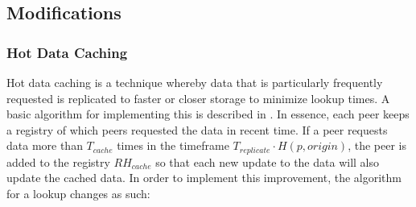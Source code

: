\documentclass[apa6]{IEEEtran}
\theoremstyle{plain}
\begin{document}
\subsection{Modifications}

\subsubsection{Hot Data Caching}
Hot data caching is a technique whereby data that is particularly frequently requested is replicated to faster or closer storage to minimize lookup times. A basic algorithm for implementing this is described in \cite{frank_method_2000}. In essence, each peer keeps a registry of which peers requested the data in recent time. If a peer requests data more than $T_{cache}$ times in the timeframe $T_{replicate} \cdot H(p, origin)$, the peer is added to the registry $RH_{cache}$ so that each new update to the data will also update the cached data. In order to implement this improvement, the algorithm for a lookup changes as such: 
\end{document}
